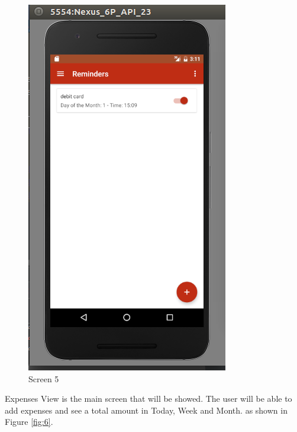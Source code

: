 \begin{figure}[ht]
\centering
\includegraphics[scale=0.5]{images/s6.png}
\caption{Screen 5}
\label{fig:5}
\end{figure}

\noindent Expenses View is the main screen that will be showed. The user will be able to add expenses and see a total amount in Today, Week and Month. as shown in Figure \ref{fig:6}. 

